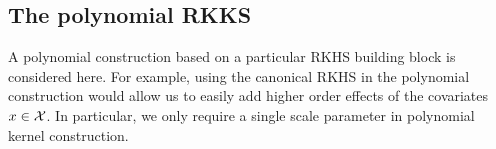
\subsection{The polynomial RKKS}

A polynomial construction based on a particular RKHS building block is considered here.
For example, using the canonical RKHS in the polynomial construction would allow us to easily add higher order effects of the covariates $x \in {\mathcal X}$.
In particular, we only require a single scale parameter in polynomial kernel construction.

